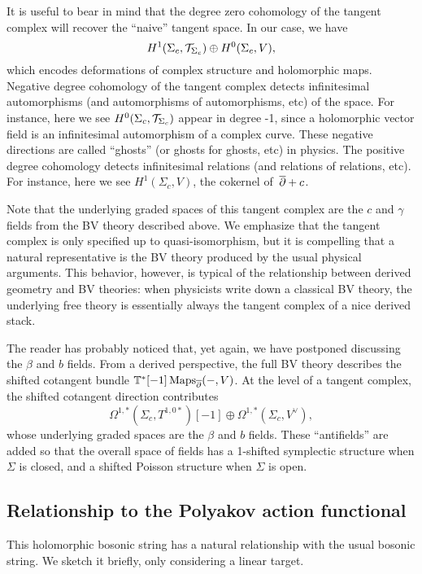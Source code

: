 \begin{rmk}
It is useful to bear in mind that the degree zero cohomology of the tangent complex will recover the ``naive'' tangent space. 
In our case, we have 
\[
H^1(\Sigma_c,\mathcal T_{\Sigma_c}) \oplus H^0(\Sigma_c,V),
\]
which encodes deformations of complex structure and holomorphic maps.
Negative degree cohomology of the tangent complex detects infinitesimal automorphisms (and automorphisms of automorphisms, etc) of the space.
For instance, here we see $H^0(\Sigma_c,\mathcal T_{\Sigma_c})$ appear in degree -1, 
since a holomorphic vector field is an infinitesimal automorphism of a complex curve.
These negative directions are called ``ghosts'' (or ghosts for ghosts, etc) in physics.
The positive degree cohomology detects infinitesimal relations (and relations of relations, etc).
For instance, here we see $H^1(\Sigma_c,V)$, the cokernel of~$\overline{\partial}+c$. 
\end{rmk}

Note that the underlying graded spaces of this tangent complex are the $c$ and $\gamma$ fields from the BV theory described above.
We emphasize that the tangent complex is only specified up to quasi-isomorphism,
but it is compelling that a natural representative is the BV theory produced by the usual physical arguments.
This behavior, however, is typical of the relationship between derived geometry and BV theories:
when physicists write down a classical BV theory, 
the underlying free theory is essentially always the tangent complex of a nice derived stack.

The reader has probably noticed that, yet again, we have postponed discussing the $\beta$ and $b$ fields.
From a derived perspective, the full BV theory describes the shifted cotangent bundle $\mathbb T^*[-1]\operatorname{Maps}_{\overline{\partial}}(-,V)$.
At the level of a tangent complex, the shifted cotangent direction contributes
\[
\Omega^{1,*}(\Sigma_c,T^{1,0*})[-1] \oplus \Omega^{1,*}(\Sigma_c,V^\vee),
\]
whose underlying graded spaces are the $\beta$ and $b$ fields.
These ``antifields'' are added so that the overall space of fields has a 1-shifted symplectic structure  when $\Sigma$ is closed, and a shifted Poisson structure when $\Sigma$ is open.

\subsection{Relationship to the Polyakov action functional}

This holomorphic bosonic string has a natural relationship with the usual bosonic string.
We sketch it briefly, only considering a linear target.

